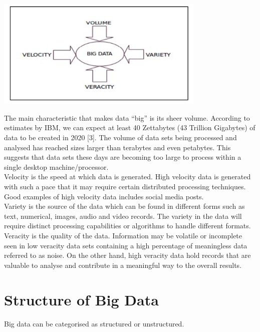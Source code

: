 \documentclass[11pt]{book}
\begin{document}
\begin{center}
\includegraphics[width=10cm]{4vbd}\\
\end{center}

The main characteristic that makes data “big” is its sheer volume. According to estimates by IBM, we can expect at least 40 Zettabytes (43 Trillion Gigabytes) of data to be created in 2020 [3]. The volume of data sets being processed and analysed has reached sizes larger than terabytes and even petabytes. This suggests that data sets these days are becoming too large to process within a single desktop machine/processor. \\

Velocity is the speed at which data is generated. High velocity data is generated with such a pace that it may require certain distributed processing techniques. Good examples of high velocity data includes social media posts.\\

Variety is the source of the data which can be found in different forms such as text, numerical, images, audio and video records. The variety in the data will require distinct processing capabilities or algorithms to handle different formats. \\

Veracity is the quality of the data. Information may be volatile or incomplete seen in low veracity data sets containing a high percentage of meaningless data referred to as noise. On the other hand, high veracity data hold records that are valuable to analyse and contribute in a meaningful way to the overall results.

\section{Structure of Big Data} 

Big data can be categorised as structured or unstructured.\\
 
\end{document}
